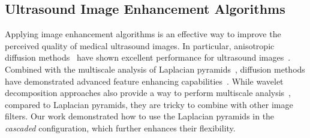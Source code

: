 






\subsection{Ultrasound Image Enhancement Algorithms}
Applying image enhancement algorithms is an effective way to improve the perceived quality of medical ultrasound images.
In particular, anisotropic diffusion methods~\cite{perona_scalespace_1990, weickert_anisotropic_1998} have shown excellent performance for ultrasound images~\cite{yongjianyu_speckle_2002, abd-elmoniem_realtime_2002, aja-fernandez_estimation_2006, krissian_oriented_2007, vegas-sanchez-ferrero_probabilisticdriven_2010, ramos-llorden_anisotropic_2015, mishra_edge_2018}.
Combined with the multiscale analysis of Laplacian pyramids~\cite{burt_laplacian_1983}, diffusion methods have demonstrated advanced feature enhancing capabilities~\cite{zhang_multiscale_2006, zhang_nonlinear_2007, kang_new_2016}.
While wavelet decomposition approaches also provide a way to perform multiscale analysis~\cite{xulizong_speckle_1998, xiaohuihao_novel_1999, pizurica_versatile_2003, yongyue_nonlinear_2006}, compared to Laplacian pyramids, they are tricky to combine with other image filters.
Our work demonstrated how to use the Laplacian pyramids in the \textit{cascaded} configuration, which further enhances their flexibility.

